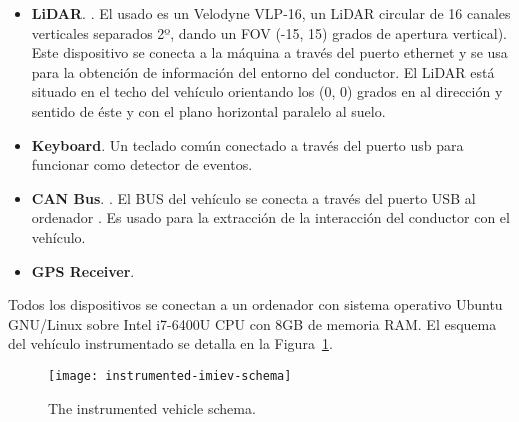 \begin{itemize}
	\item \textbf{LiDAR}. . El usado es un Velodyne VLP-16, un LiDAR circular de 16 canales verticales separados 2º, dando un FOV (-15, 15) grados de apertura vertical). Este dispositivo se conecta a la máquina a través del puerto ethernet y se usa para la obtención de información del entorno del conductor. El LiDAR está situado en el techo del vehículo orientando los (0, 0) grados en al dirección y sentido de éste y con el plano horizontal paralelo al suelo.
	\item \textbf{Keyboard}.  Un teclado común conectado a través del puerto usb para funcionar como detector de eventos.
	\item \textbf{CAN Bus}. . El BUS del vehículo se conecta a través del puerto USB al ordenador . Es usado para la extracción de la interacción del conductor con el vehículo.
	\item \textbf{GPS Receiver}. 
\end{itemize}

Todos los dispositivos se conectan a un ordenador con sistema operativo Ubuntu GNU/Linux sobre Intel i7-6400U CPU con 8GB de memoria RAM. El esquema del vehículo instrumentado se detalla en la Figura~\ref{fig:instrumented-imiev-schema}.

\begin{figure}
	\texttt{[image: instrumented-imiev-schema]}
	\caption{The instrumented vehicle schema.}
	\label{fig:instrumented-imiev-schema}
\end{figure}

